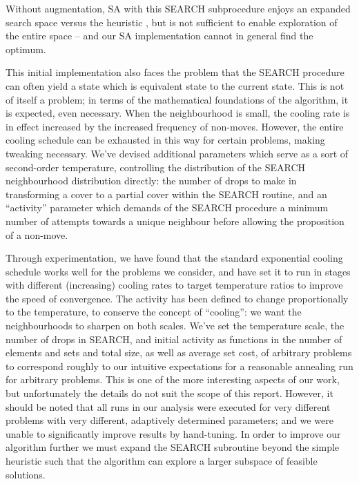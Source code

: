 Without augmentation, SA with this SEARCH subprocedure enjoys an expanded search space versus the heuristic \perse, but is not sufficient to enable exploration of the entire space -- and our SA implementation cannot in general find the optimum.

This initial implementation also faces the problem that the SEARCH procedure can often yield a state which is equivalent state to the current state. This is not of itself a problem; in terms of the mathematical foundations of the algorithm, it is expected, even necessary. When the neighbourhood is small, the cooling rate is in effect increased by the increased frequency of non-moves. However, the entire cooling schedule can be exhausted in this way for certain problems, making tweaking necessary. We've devised additional parameters which serve as a sort of second-order temperature, controlling the distribution of the SEARCH neighbourhood distribution directly: the number of drops to make in transforming a cover to a partial cover within the SEARCH routine, and an ``activity'' parameter which demands of the SEARCH procedure a minimum number of attempts towards a unique neighbour before allowing the proposition of a non-move.

Through experimentation, we have found that the standard exponential cooling schedule works well for the problems we consider, and have set it to run in stages with different (increasing) cooling rates to target temperature ratios to improve the speed of convergence. The activity has been defined to change proportionally to the temperature, to conserve the concept of ``cooling'': we want the neighbourhoods to sharpen on both scales. We've set the temperature scale, the number of drops in SEARCH, and initial activity as functions in the number of elements and sets and total size, as well as average set cost, of arbitrary problems to correspond roughly to our intuitive expectations for a reasonable annealing run for arbitrary problems. This is one of the more interesting aspects of our work, but unfortunately the details do not suit the scope of this report. However, it should be noted that all runs in our analysis were executed for very different problems with very different, adaptively determined parameters; and we were unable to significantly improve results by hand-tuning. In order to improve our algorithm further we must expand the SEARCH subroutine beyond the simple heuristic such that the algorithm can explore a larger subspace of feasible solutions.



